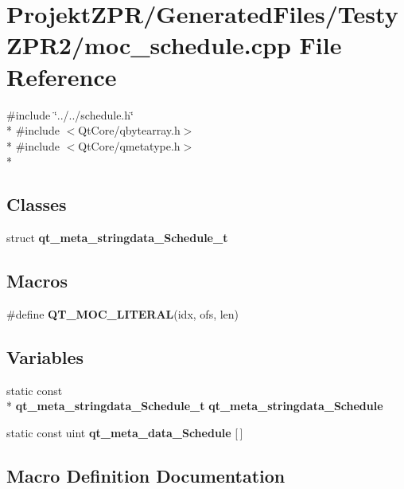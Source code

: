 \section{Projekt\-Z\-P\-R/\-Generated\-Files/\-Testy\-Z\-P\-R2/moc\-\_\-schedule.cpp File Reference}
\label{_testy_z_p_r2_2moc__schedule_8cpp}
{\ttfamily \#include \char`\"{}../../schedule.\-h\char`\"{}}\\*
{\ttfamily \#include $<$Qt\-Core/qbytearray.\-h$>$}\\*
{\ttfamily \#include $<$Qt\-Core/qmetatype.\-h$>$}\\*
\subsection*{Classes}
\begin{DoxyCompactItemize}
\item 
struct {\bf qt\-\_\-meta\-\_\-stringdata\-\_\-\-Schedule\-\_\-t}
\end{DoxyCompactItemize}
\subsection*{Macros}
\begin{DoxyCompactItemize}
\item 
\#define {\bf Q\-T\-\_\-\-M\-O\-C\-\_\-\-L\-I\-T\-E\-R\-A\-L}(idx, ofs, len)
\end{DoxyCompactItemize}
\subsection*{Variables}
\begin{DoxyCompactItemize}
\item 
static const \\*
{\bf qt\-\_\-meta\-\_\-stringdata\-\_\-\-Schedule\-\_\-t} {\bf qt\-\_\-meta\-\_\-stringdata\-\_\-\-Schedule}
\item 
static const uint {\bf qt\-\_\-meta\-\_\-data\-\_\-\-Schedule} [$\,$]
\end{DoxyCompactItemize}


\subsection{Macro Definition Documentation}
